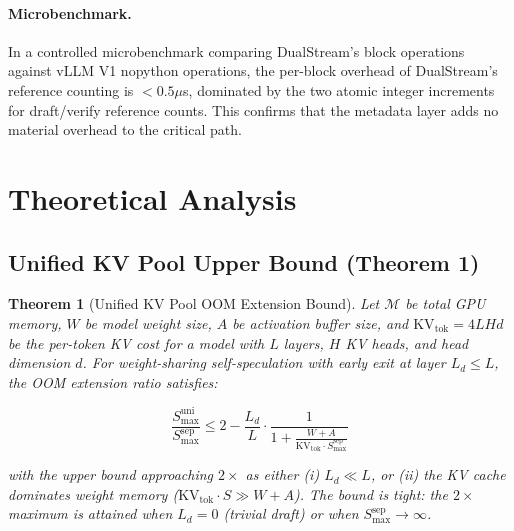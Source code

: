 \documentclass[review]{elsarticle}
\newtheorem{theorem}{Theorem}[section]
\theoremstyle{definition}
\theoremstyle{remark}
\begin{document}
\paragraph{Microbenchmark.}
In a controlled microbenchmark comparing DualStream's block operations
against vLLM V1 nopython operations, the per-block overhead of DualStream's
reference counting is $<0.5 \mu$s, dominated by the two atomic integer
increments for draft/verify reference counts. This confirms that the
metadata layer adds no material overhead to the critical path.

\section{Theoretical Analysis}

\subsection{Unified KV Pool Upper Bound (Theorem 1)}

\begin{theorem}[Unified KV Pool OOM Extension Bound]
\label{thm:oom-bound}
Let $\mathcal{M}$ be total GPU memory, $W$ be model weight size, $A$ be
activation buffer size, and $\text{KV}_{\text{tok}} = 4L H d$ be the
per-token KV cost for a model with $L$ layers, $H$ KV heads, and head
dimension $d$. For weight-sharing self-speculation with early exit at
layer $L_d \le L$, the OOM extension ratio satisfies:

\[
\frac{S_{\max}^{\text{uni}}}{S_{\max}^{\text{sep}}}
    \le 2 - \frac{L_d}{L} \cdot \frac{1}{1 + \frac{W+A}{\text{KV}_{\text{tok}}
    \cdot S_{\max}^{\text{sep}}}}
\]

with the upper bound approaching $2\times$ as either (i) $L_d \ll L$,
or (ii) the KV cache dominates weight memory
($\text{KV}_{\text{tok}} \cdot S \gg W + A$). The bound is tight:
the $2\times$ maximum is attained when $L_d = 0$ (trivial draft) or
when $S_{\max}^{\text{sep}} \to \infty$.
\end{theorem}
\end{document}

